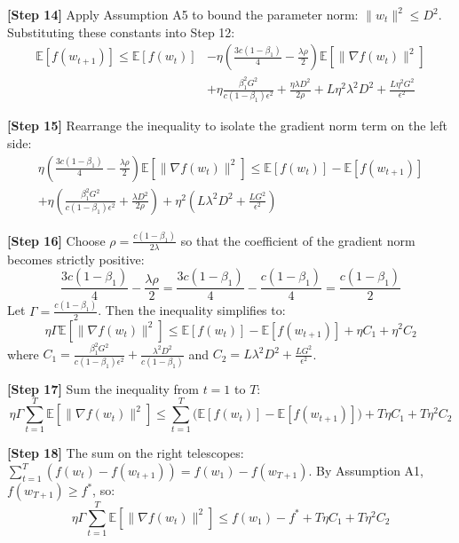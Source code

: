 \documentclass[11pt]{article}
\begin{document}
\textbf{[Step 14]} Apply Assumption A5 to bound the parameter norm: $\|w_t\|^2 \leq D^2$. Substituting these constants into Step 12:
\begin{align}
    \mathbb{E}[f(w_{t+1})] \leq \mathbb{E}[f(w_t)] &- \eta \left( \frac{3c(1-\beta_1)}{4} - \frac{\lambda \rho}{2} \right) \mathbb{E}[\|\nabla f(w_t)\|^2] \nonumber \\
    &+ \eta \frac{\beta_1^2 G^2}{c(1-\beta_1)\epsilon^2} + \frac{\eta \lambda D^2}{2\rho} + L \eta^2 \lambda^2 D^2 + \frac{L \eta^2 G^2}{\epsilon^2}
\end{align}

\textbf{[Step 15]} Rearrange the inequality to isolate the gradient norm term on the left side:
\begin{align}
    \eta \left( \frac{3c(1-\beta_1)}{4} - \frac{\lambda \rho}{2} \right) \mathbb{E}[\|\nabla f(w_t)\|^2] \leq \mathbb{E}[f(w_t)] - \mathbb{E}[f(w_{t+1})] \nonumber \\
    + \eta \left( \frac{\beta_1^2 G^2}{c(1-\beta_1)\epsilon^2} + \frac{\lambda D^2}{2\rho} \right) + \eta^2 \left( L \lambda^2 D^2 + \frac{L G^2}{\epsilon^2} \right)
\end{align}

\textbf{[Step 16]} Choose $\rho = \frac{c(1-\beta_1)}{2\lambda}$ so that the coefficient of the gradient norm becomes strictly positive:
\begin{equation}
    \frac{3c(1-\beta_1)}{4} - \frac{\lambda \rho}{2} = \frac{3c(1-\beta_1)}{4} - \frac{c(1-\beta_1)}{4} = \frac{c(1-\beta_1)}{2}
\end{equation}
Let $\Gamma = \frac{c(1-\beta_1)}{2}$. Then the inequality simplifies to:
\begin{equation}
    \eta \Gamma \mathbb{E}[\|\nabla f(w_t)\|^2] \leq \mathbb{E}[f(w_t)] - \mathbb{E}[f(w_{t+1})] + \eta C_1 + \eta^2 C_2
\end{equation}
where $C_1 = \frac{\beta_1^2 G^2}{c(1-\beta_1)\epsilon^2} + \frac{\lambda^2 D^2}{c(1-\beta_1)}$ and $C_2 = L \lambda^2 D^2 + \frac{L G^2}{\epsilon^2}$.

\textbf{[Step 17]} Sum the inequality from $t=1$ to $T$:
\begin{equation}
    \eta \Gamma \sum_{t=1}^T \mathbb{E}[\|\nabla f(w_t)\|^2] \leq \sum_{t=1}^T \Big( \mathbb{E}[f(w_t)] - \mathbb{E}[f(w_{t+1})] \Big) + T \eta C_1 + T \eta^2 C_2
\end{equation}

\textbf{[Step 18]} The sum on the right telescopes: $\sum_{t=1}^T (f(w_t) - f(w_{t+1})) = f(w_1) - f(w_{T+1})$. By Assumption A1, $f(w_{T+1}) \geq f^*$, so:
\begin{equation}
    \eta \Gamma \sum_{t=1}^T \mathbb{E}[\|\nabla f(w_t)\|^2] \leq f(w_1) - f^* + T \eta C_1 + T \eta^2 C_2
\end{equation}
\end{document}
